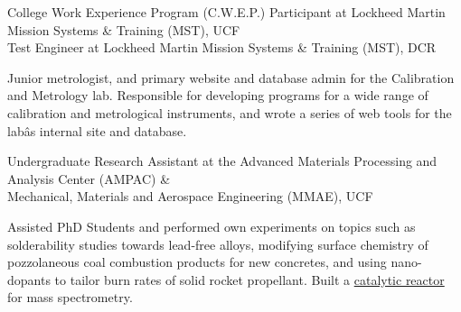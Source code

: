 \documentclass[]{deedy-resume-openfont} %
\newif\ifweb %
\begin{document}
\begin{minipage}[t]{0.65\textwidth}
\ifweb
\runsubsection{Evenly}{http://evenly.com}
\descript{| Front-end Web Developer}
\location{September 2014 | San Francisco, CA}
\begin{tightemize}
\item Front-end web developer, javascript, UI and splash page.
\item Evenly was recently acquired by Square and became \href{https://square.com/cash}{Square Cash}.
\end{tightemize}
\sectionsep
\fi

College Work Experience Program (C.W.E.P.) Participant at Lockheed Martin Mission Systems \& Training (MST), UCF\\
Test Engineer at Lockheed Martin Mission Systems \& Training (MST), DCR\\
\begin{tightemize}
\item Junior  metrologist,  and  primary  website  and  database  admin  for  the Calibration and Metrology lab.
\ifweb\item\fi Responsible for developing programs for a wide range of calibration and metrological instruments, and wrote a series of web tools for the labâs internal site and database.
\end{tightemize}
\sectionsep

Undergraduate Research Assistant at the Advanced Materials Processing and Analysis Center (AMPAC) \&\\
Mechanical, Materials and Aerospace Engineering (MMAE), UCF\\
\begin{tightemize}
\item Assisted  PhD  Students  and  performed  own  experiments  on  topics  such  as solderability studies towards lead-free alloys, modifying surface chemistry of pozzolaneous coal combustion products for new concretes, and using nano-dopants to tailor burn rates of solid rocket propellant.
\ifweb\item\fi Built a \href{http://sudipta-seal.ucf.edu/images/photos/characterization/Catalytic-Reactor.jpg}{catalytic reactor} for mass spectrometry.
\end{tightemize}


\end{minipage}
\end{document}

